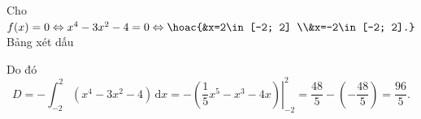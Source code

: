 \begin{bt}
{\begin{enumerate}
			Cho  $f(x)=0\Leftrightarrow x^4-3x^2-4=0\Leftrightarrow\hoac{&x=2\in[-2; 2] \\&x=-2\in[-2; 2].}$\\
			Bảng xét dấu 
			\begin{center}
			\end{center}
			Do đó \[D=-\displaystyle\int_{-2}^2\left(x^4-3x^2-4\right)  \mathrm{\,d}x=-\left.\left(\dfrac{1}{5} x^5-x^3-4x\right)\right|_{-2}^2=\dfrac{48}{5}-\left(-\dfrac{48}{5}\right)=\dfrac{96}{5}.\]
		\end{enumerate}
	 }
\end{bt}

